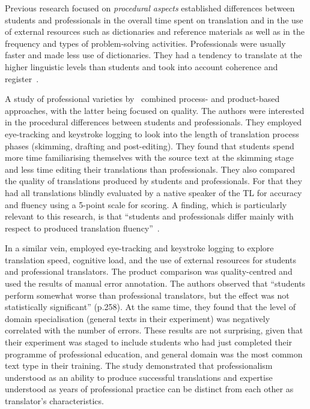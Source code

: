Previous research focused on \textit{procedural aspects} established differences between students and professionals in the overall time spent on translation and in the use of external resources such as dictionaries and reference materials as well as in the frequency and types of problem-solving activities. Professionals were usually faster and made less use of dictionaries. They had a tendency to translate at the higher linguistic levels than students and took into account coherence and register~\cite{Tirkkonen1990}.  

A study of professional varieties by~\citet{Carl2010} combined process- and product-based approaches, with the latter being focused on quality. The authors were interested in the procedural differences between students and professionals. They employed eye-tracking and keystroke logging to look into the length of translation process phases (skimming, drafting and post-editing). They found that students spend more time familiarising themselves with the source text at the skimming stage and less time editing their translations than professionals. They also compared the quality of translations produced by students and professionals. For that they had all translations blindly evaluated by a native speaker of the TL for accuracy and fluency using a 5-point scale for scoring. A finding, which is particularly relevant to this research, is that ``students and professionals differ mainly with respect to produced translation fluency''~\cite{Carl2010}.

In a similar vein, \citet{Daems2017} employed eye-tracking and keystroke logging to explore translation speed, cognitive load, and the use of external resources for students and professional translators. The product comparison was quality-centred and used the results of manual error annotation. The authors observed that ``students perform somewhat worse than professional translators, but the effect was not statistically significant'' (p.258). At the same time, they found that the level of domain specialisation (general texts in their experiment) was negatively correlated with the number of errors. These results are not surprising, given that their experiment was staged to include students who had just completed their programme of professional education, and general domain was the most common text type in their training. The study demonstrated that professionalism understood as an ability to produce successful translations and expertise understood as years of professional practice can be distinct from each other as translator's characteristics.

